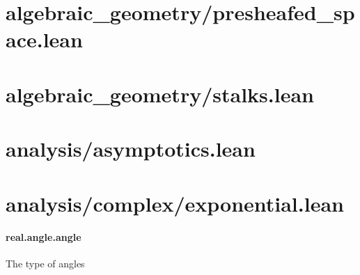 \documentclass{article}
\begin{document}
\section{algebraic\_geometry/presheafed\_space.lean}\section{algebraic\_geometry/stalks.lean}\section{analysis/asymptotics.lean}\section{analysis/complex/exponential.lean}\paragraph{real.angle.angle}
\par
The type of angles
\end{document}
